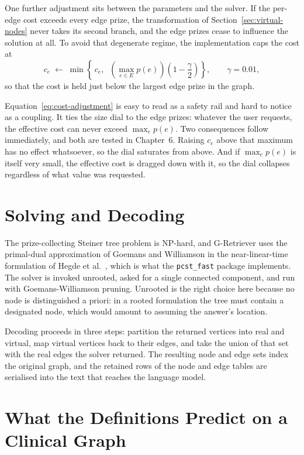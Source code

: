 One further adjustment sits between the parameters and the solver. If the
per-edge cost exceeds every edge prize, the transformation of
Section~\ref{sec:virtual-nodes} never takes its second branch, and the edge
prizes cease to influence the solution at all. To avoid that degenerate regime,
the implementation caps the cost at
%
\begin{equation}
c_e \;\leftarrow\; \min\!\left\{\, c_e, \;\; \left(\max_{e \in E} p(e)\right)\left(1 - \frac{\gamma}{2}\right) \right\},
\qquad \gamma = 0.01 ,
\label{eq:cost-adjustment}
\end{equation}
%
so that the cost is held just below the largest edge prize in the graph.

Equation~\ref{eq:cost-adjustment} is easy to read as a safety rail and hard to
notice as a coupling. It ties the size dial to the edge prizes: whatever the user
requests, the effective cost can never exceed $\max_e p(e)$. Two consequences
follow immediately, and both are tested in Chapter~6. Raising $c_e$ above that
maximum has no effect whatsoever, so the dial saturates from above. And if
$\max_e p(e)$ is itself very small, the effective cost is dragged down with it,
so the dial collapses regardless of what value was requested.

\section{Solving and Decoding} \label{sec:pcst-solver}

The prize-collecting Steiner tree problem is NP-hard, and G-Retriever uses the
primal-dual approximation of Goemans and Williamson in the near-linear-time
formulation of Hegde et al.~\cite{hegde2015nearlylinear}, which is what the
\texttt{pcst\_fast} package implements. The solver is invoked unrooted, asked for
a single connected component, and run with Goemans-Williamson pruning. Unrooted
is the right choice here because no node is distinguished a priori: in a rooted
formulation the tree must contain a designated node, which would amount to
assuming the answer's location.

Decoding proceeds in three steps: partition the returned vertices into real and
virtual, map virtual vertices back to their edges, and take the union of that set
with the real edges the solver returned. The resulting node and edge sets index
the original graph, and the retained rows of the node and edge tables are
serialised into the text that reaches the language model.

\section{What the Definitions Predict on a Clinical Graph} \label{sec:pcst-consequences}

